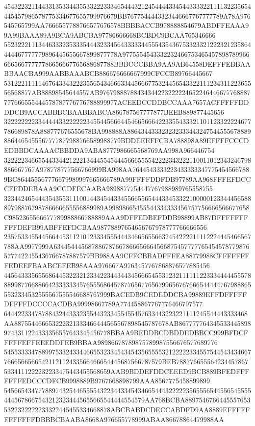 454322321144331353344355332223334654443212454444334544333322111132235654445457986578775334677655799976679BB7677544443323446667767777789A78A976545765799AA7666557788766577676578BBBBACCB978888854679ABDFFEAAA99A99BAAA89A9BCA9ABCBA97786666668BCBDC9BCAA765346666
552322211134463332353335444323345643333344555435436753323321222321235864444467777779896445655667899877778A977555454333223246675346545789878996666656677777786656667765688687788BBBCCCBBA9AA9AB64558DEFFFEBBAABBAACBA999AABBAAABCB886676666667999CFCCB89766445667
53122211111467643343222355654346663344566677532445654332211123431122365556568877AB88898545644557AB97679888788434344223222224652246446677768887777666555444578787776776788899977ACEEDCCDDBCCAAA7657ACFFFFFDDDDCB9ACCABBBCBAABBABCA866787567777877BEEB889877445656
322222222334444433222222345544566644546656664223355433321101123322224677786689878A888777676555678BA998888A8864344333232323334432475445556788898864465455567777877988766589988779BDDEEEFFCBA788898A89EFFFFCCCDEDBBDCAAAACBBDDA9ABA8777986665568769AA998A966446754
322222346655443344212221344455454445666555542222343222110011012343246798886667767A978778777566766999BA998AA76445433332234333333477754545667889BC864455567776679989997665666789A99FFFFDDFDB97789AA968FFFEFDCCCFFDDEBAAA9CCDFECAABA9898877754447767988989765558755
32344246544435435531110014434544334556655654443345332210000012334445658889798876798786666655556889989A99898665455544334333456757756666566677658C9852365566677789988866788889AAA9DFFEDBEFDDB98899AB87DFFFFFFFFFFDEFB99ABFFEFDCBAA98778897654656767978777766666556
235753345544566445311210123334555444346656556632454222211112224445466567788AA9977999A6344544456878867876678666566645668754577777654545787798765777422455436766787887579BB988AA9CFFCBBADFFFEA88779988CFFFFFFFFEDEEFBAABCEFEB98AAA976667A9763457767868876577885456
4456433356556864453223212334223443443456665455312321111112233344444555788899877668866423333334576555686457877656776567996567676665444447679888655532334532555567555546688767999BACEDB9CEDEDDCBA99889EFFDFFFFFDFFFFDCCCCACDBA99998667789A774458867767776466797577
64442233478788432443332355443233455455457633443223221111245544443333468AA887554466653222321333466444565567898545787678AB8677777643455334458989743311224333356557643345456778BBAA9BEDDBCDBDDEDBBCC999BFDCFFFFFEFFEEEDDFEB9BBAA98986678789875789987556676577689776
5455333347889975332433446655323345434543565555321222223345575445434346677666566566542112112433566466654445687566787579BEB7887766555642344578675334111222232233475443455568659AAB9BDDEFDDCEEED9BCB889BFEDFFFFFFFEDCCCDFCB9998889B9767668898799AAA8567775458899899
54566543477788974325446555543223443345434665444322222356555654455654555544456786675432123234445655665544444554579AA768BCBA88975467664455576535322322222233322445455334668878ABCBABDCDECCABDFD9AA8889EFFFFFFFFFFFFDBBBCBAABA8668A976655778999ABAA86678864479988AA
